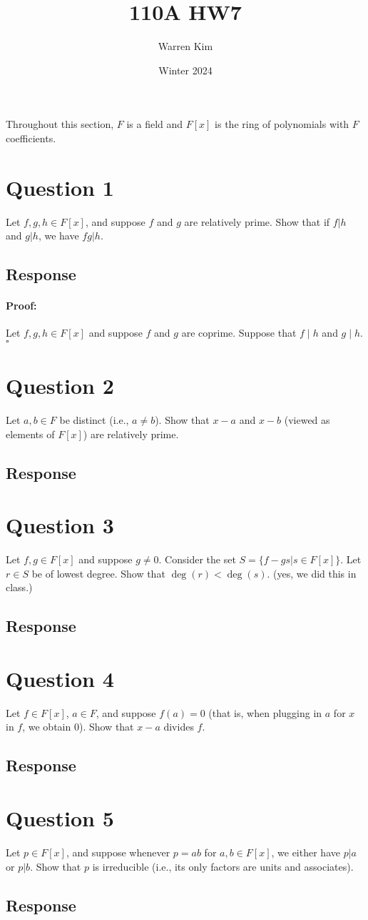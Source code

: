 \documentclass [12pt] {article}
\title{110A HW7}
\author{Warren Kim}
\date{Winter 2024}
\newenvironment{proof}{\paragraph{Proof:}}{\hfill$\square$}
\begin{document}
\maketitle

Throughout this section, $F$ is a field and $F[x]$ is the ring of polynomials with $F$ coefficients.

\section*{Question 1}
Let $f,g,h\in F[x]$, and suppose $f$ and $g$ are relatively prime. Show that if $f|h$ and $g|h$, we have $fg|h$.

\subsection*{Response}
\begin{proof}
    Let $f, g, h \in F[x]$ and suppose $f$ and $g$ are coprime. Suppose that $f \mid h$ and $g \mid h$.
\end{proof}
\newpage

\section*{Question 2}
Let $a,b\in F$ be distinct (i.e., $a\neq b$). Show that $x-a$ and $x-b$ (viewed as elements of $F[x]$) are relatively prime.

\subsection*{Response}
\newpage

\section*{Question 3}
Let $f,g\in F[x]$ and suppose $g\neq 0$. Consider the set $S=\{f-gs|s\in F[x]\}$. Let $r\in S$ be of lowest degree. Show that $\deg(r)<\deg(s)$. (yes, we did this in class.)

\subsection*{Response}
\newpage

\section*{Question 4}
Let $f\in F[x]$, $a\in F$, and suppose $f(a)=0$ (that is, when plugging in $a$ for $x$ in $f$, we obtain $0$). Show that $x-a$ divides $f$.

\subsection*{Response}
\newpage

\section*{Question 5}
Let $p\in F[x]$, and suppose whenever $p=ab$ for $a,b\in F[x]$, we either have $p|a$ or $p|b$. Show that $p$ is irreducible (i.e., its only factors are units and associates).

\subsection*{Response}
\newpage
\end{document}
